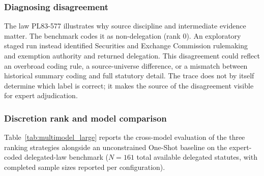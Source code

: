 \documentclass[runningheads]{llncs}
\begin{document}
\subsubsection{Diagnosing disagreement}

The law PL83-577 illustrates why source discipline and intermediate evidence matter. The benchmark codes it as non-delegation (rank 0). An exploratory staged run instead identified Securities and Exchange Commission rulemaking and exemption authority and returned delegation. This disagreement could reflect an overbroad coding rule, a source-universe difference, or a mismatch between historical summary coding and full statutory detail. The trace does not by itself determine which label is correct; it makes the source of the disagreement visible for expert adjudication.
\vspace{-0.5cm}
\subsubsection{Discretion rank and model comparison}
Table~\ref{tab:multimodel_large} reports the cross-model evaluation of the three ranking strategies alongside an unconstrained One-Shot baseline on the expert-coded delegated-law benchmark ($N=161$ total available delegated statutes, with completed sample sizes reported per configuration).
\end{document}
